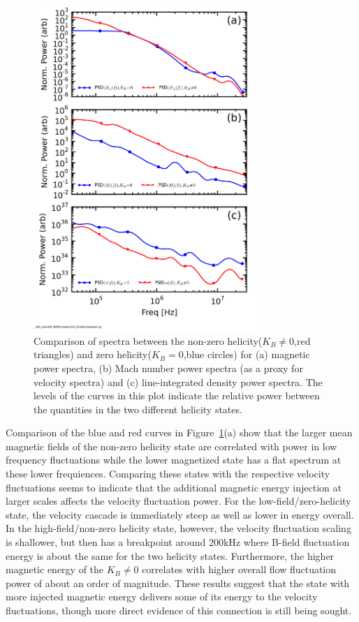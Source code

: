 \documentclass[aip,prl,amsmath,amssymb,reprint,superscriptaddress]{revtex4-1} %
\begin{document}
\begin{figure}[!htbp]
\centerline{
\includegraphics[width=8.5cm]{BvsFlowvsDensspec_2fluxes_separateplots_40t60us}}
\caption{\label{fig:BvsFlow} Comparison of spectra between the non-zero helicity($K_{B}\neq 0$,red triangles) and zero helicity($K_{B}=0$,blue circles) for (a) magnetic power spectra, (b) Mach number power spectra (as a proxy for velocity spectra) and (c) line-integrated density power spectra. The levels of the curves in this plot indicate the relative power between the quantities in the two different helicity states.}
\end{figure}

Comparison of the blue and red curves in Figure~\ref{fig:BvsFlow}(a) show that the larger mean magnetic fields of the non-zero helicity state are correlated with power in low frequency fluctuations while the lower magnetized state has a flat spectrum at these lower frequiences. Comparing these states with the respective velocity fluctuations seems to indicate that the additional magnetic energy injection at larger scales affects the velocity fluctuation power. For the low-field/zero-helicity state, the velocity cascade is immediately steep as well as lower in energy overall. In the high-field/non-zero helicity state, however, the velocity fluctuation scaling is shallower, but then has a breakpoint around 200kHz where B-field fluctuation energy is about the same for the two helicity states. Furthermore, the higher magnetic energy of the $K_{B}\neq 0$ correlates with higher overall flow fluctuation power of about an order of magnitude. These results suggest that the state with more injected magnetic energy delivers some of its energy to the velocity fluctuations, though more direct evidence of this connection is still being sought.
\end{document}
